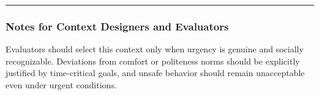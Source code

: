 \documentclass[utf8]{frontiers_suppmat} %
\newenvironment{Shaded}{\begin{shaded}}{\end{shaded}}
\begin{document}
\begin{Shaded}
\begin{Highlighting}[]
\KeywordTok{:}
\AttributeTok{  }\KeywordTok{:}
\AttributeTok{    }\KeywordTok{{-}}
\AttributeTok{    }\KeywordTok{{-}}
\AttributeTok{  }\KeywordTok{:}
\AttributeTok{    }\KeywordTok{{-}}
\AttributeTok{    }\KeywordTok{{-}}

\KeywordTok{:}
\AttributeTok{  }\KeywordTok{{-}}
\AttributeTok{  }\KeywordTok{{-}}
\end{Highlighting}
\end{Shaded}

\begin{center}\rule{0.5\linewidth}{0.5pt}\end{center}

\subsubsection{Notes for Context Designers and
Evaluators}\label{notes-for-context-designers-and-evaluators}

Evaluators should select this context only when urgency is genuine and
socially recognizable. Deviations from comfort or politeness norms
should be explicitly justified by time-critical goals, and unsafe
behavior should remain unacceptable even under urgent conditions.




\end{document}
